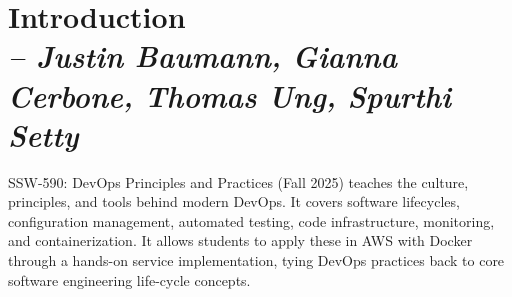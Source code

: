 \chapter{Introduction \\
\small{\textit{-- Justin Baumann, Gianna Cerbone, Thomas Ung, Spurthi Setty}}
\label{Chapter::Introduction}}

 SSW-590: DevOps Principles and Practices (Fall 2025) teaches the culture, principles, and tools behind modern DevOps. It covers software lifecycles, configuration management, automated testing, code infrastructure, monitoring, and containerization. It allows students to apply these in AWS with Docker through a hands-on service implementation, tying DevOps practices back to core software engineering life-cycle concepts.